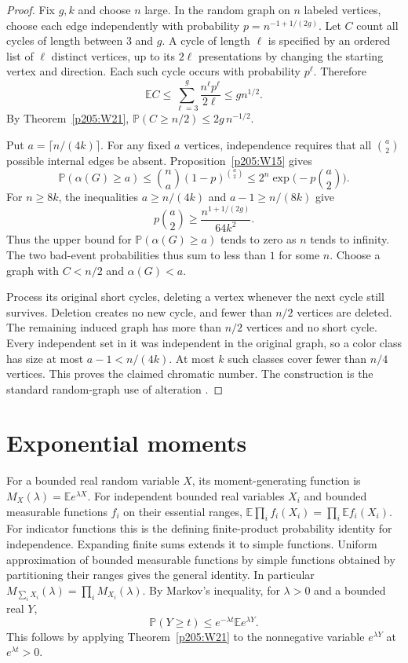 \documentclass[11pt,oneside,openany]{book}
\theoremstyle{plain}
\theoremstyle{definition}
\theoremstyle{remark}
\begin{document}
\begin{proof}
Fix \(g,k\) and choose \(n\) large. In the random graph on \(n\)
labeled vertices, choose each edge independently with
probability \(p=n^{-1+1/(2g)}\). Let \(C\) count all cycles of
length between \(3\) and \(g\). A cycle of length \(\ell\)
is specified by an ordered list of \(\ell\) distinct vertices,
up to its \(2\ell\) presentations by changing the starting
vertex and direction. Each such cycle occurs with probability
\(p^\ell\). Therefore
\[
 \mathbb E C\le \sum_{\ell=3}^g \frac{n^\ell p^\ell}{2\ell}
      \le g n^{1/2}.
\]
By Theorem~\ref{p205:W21},
\(\mathbb P(C\ge n/2)\le 2g\,n^{-1/2}\).

Put \(a=\lceil n/(4k)\rceil\). For any fixed \(a\) vertices,
independence requires that all \(\binom a2\) possible internal
edges be absent. Proposition~\ref{p205:W15} gives
\[
 \mathbb P(\alpha(G)\ge a)
    \le \binom na(1-p)^{\binom a2}
    \le 2^n\exp\!\bigl(-p\binom a2\bigr).
\]
For \(n\ge 8k\), the inequalities \(a\ge n/(4k)\) and
\(a-1\ge n/(8k)\) give
\[
  p\binom a2\ge \frac{n^{1+1/(2g)}}{64k^2}.
\]
Thus the upper bound for \(\mathbb P(\alpha(G)\ge a)\) tends
to zero as \(n\) tends to infinity. The two bad-event
probabilities thus sum to less than \(1\) for some \(n\).
Choose a graph with \(C<n/2\) and \(\alpha(G)<a\).

Process its original short cycles, deleting a vertex whenever
the next cycle still survives. Deletion creates no new cycle,
and fewer than \(n/2\) vertices are deleted. The remaining
induced graph has more than \(n/2\) vertices and no short
cycle. Every independent set in it was independent in the
original graph, so a color class has size at most
\(a-1<n/(4k)\). At most \(k\) such classes cover fewer than
\(n/4\) vertices. This proves the claimed chromatic number.
The construction is the standard random-graph use of alteration
\cite{alon}.
\end{proof}

\section{Exponential moments}

For a bounded real random variable \(X\), its moment-generating
function is \(M_X(\lambda)=\mathbb E e^{\lambda X}\).
For independent bounded real variables \(X_i\) and bounded
measurable functions \(f_i\) on their essential ranges,
\(\mathbb E\prod_i f_i(X_i)=\prod_i\mathbb E f_i(X_i)\).
For indicator functions this is the defining finite-product
probability identity for independence. Expanding finite sums
extends it to simple functions. Uniform approximation of
bounded measurable functions by simple functions obtained
by partitioning their ranges gives the general identity.
In particular \(M_{\sum_i X_i}(\lambda)=\prod_iM_{X_i}(\lambda)\).
By Markov's inequality, for \(\lambda>0\) and a bounded
real \(Y\),
\[
 \mathbb P(Y\ge t)\le e^{-\lambda t}\mathbb E e^{\lambda Y}.
\]
This follows by applying Theorem~\ref{p205:W21} to the
nonnegative variable \(e^{\lambda Y}\) at \(e^{\lambda t}>0\).
\end{document}
